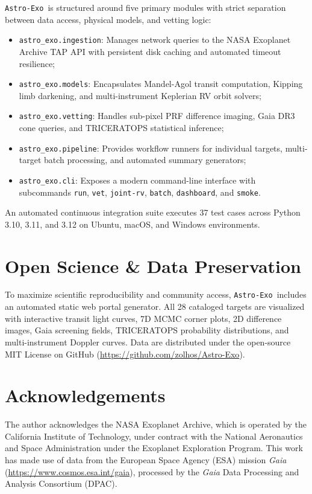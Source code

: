 \documentclass[twocolumn,trackchanges]{aastex631}
\newcommand{\astroexo}{\texttt{Astro-Exo}}
\begin{document}
\astroexo\ is structured around five primary modules with strict separation between data access, physical models, and vetting logic:
\begin{itemize}
    \item \texttt{astro\_exo.ingestion}: Manages network queries to the NASA Exoplanet Archive TAP API with persistent disk caching and automated timeout resilience;
    \item \texttt{astro\_exo.models}: Encapsulates Mandel-Agol transit computation, Kipping limb darkening, and multi-instrument Keplerian RV orbit solvers;
    \item \texttt{astro\_exo.vetting}: Handles sub-pixel PRF difference imaging, Gaia DR3 cone queries, and TRICERATOPS statistical inference;
    \item \texttt{astro\_exo.pipeline}: Provides workflow runners for individual targets, multi-target batch processing, and automated summary generators;
    \item \texttt{astro\_exo.cli}: Exposes a modern command-line interface with subcommands \texttt{run}, \texttt{vet}, \texttt{joint-rv}, \texttt{batch}, \texttt{dashboard}, and \texttt{smoke}.
\end{itemize}

An automated continuous integration suite executes 37 test cases across Python 3.10, 3.11, and 3.12 on Ubuntu, macOS, and Windows environments.

\section{Open Science \& Data Preservation}
\label{sec:openscience}

To maximize scientific reproducibility and community access, \astroexo\ includes an automated static web portal generator. All 28 cataloged targets are visualized with interactive transit light curves, 7D MCMC corner plots, 2D difference images, Gaia screening fields, TRICERATOPS probability distributions, and multi-instrument Doppler curves. Data are distributed under the open-source MIT License on GitHub (\url{https://github.com/zolhos/Astro-Exo}).

\section*{Acknowledgements}
The author acknowledges the NASA Exoplanet Archive, which is operated by the California Institute of Technology, under contract with the National Aeronautics and Space Administration under the Exoplanet Exploration Program. This work has made use of data from the European Space Agency (ESA) mission \textit{Gaia} (\url{https://www.cosmos.esa.int/gaia}), processed by the \textit{Gaia} Data Processing and Analysis Consortium (DPAC).



\end{document}
